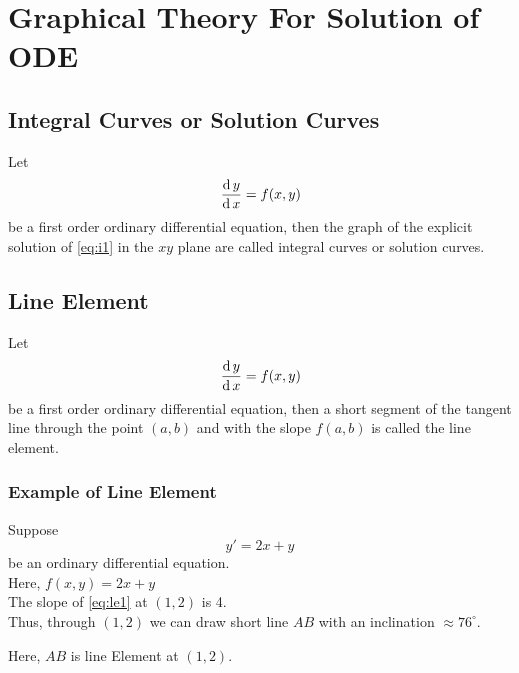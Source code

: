 \documentclass[../main-sheet.tex]{subfiles}
\begin{document}
\chapter{Graphical Theory For Solution of ODE}
\section{Integral Curves or Solution Curves}
Let
\begin{equation}
    \,\frac{\mathrm{d}\,y}{\mathrm{d}\,x}=f(x,y) \label{eq:i1}
\end{equation}
be a first order ordinary differential equation, then the graph of the explicit solution of \eqref{eq:i1} in the \(xy\) plane are called integral curves or solution curves.
\section{Line Element}
Let
\begin{equation}
    \,\frac{\mathrm{d}\,y}{\mathrm{d}\,x}=f(x,y) \label{eq:l1}
\end{equation}
be a first order ordinary differential equation, then a short segment of the tangent line through the point \((a,b)\) and with the slope \(f(a,b)\) is called the line element.
\subsection{Example of Line Element}
Suppose
\begin{equation}
    y'=2x+y\label{eq:le1}
\end{equation}
be an ordinary differential equation.\\
Here, \(f(x,y)=2x+y\)\\
The slope of \eqref{eq:le1} at \((1,2)\) is 4.\\
Thus, through \((1,2)\) we can draw short line \(AB\) with an inclination \(\approx 76^{\circ}\).
\begin{figure}[H]
    \centering
\end{figure}
Here, \(AB\) is line Element at \((1,2)\).
\end{document}
